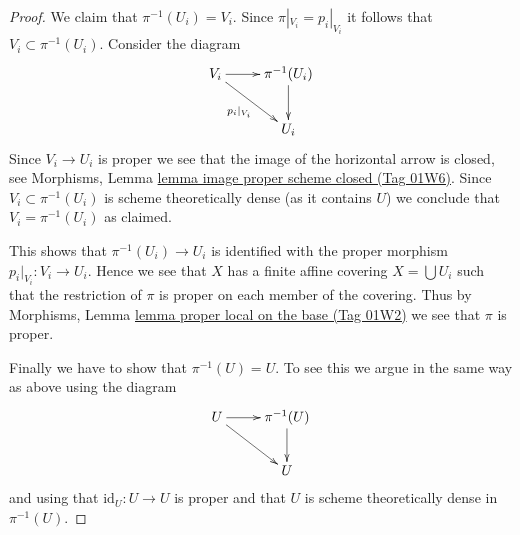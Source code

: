 \documentclass{amsart}
\theoremstyle{plain}
\theoremstyle{definition}
\theoremstyle{remark}
\numberwithin{equation}{subsection}
\begin{document}
\begin{proof}
\medskip\noindent
We claim that $\pi^{-1}(U_i) = V_i$.
Since $\pi|_{V_i} = p_i|_{V_i}$ it follows that
$V_i \subset \pi^{-1}(U_i)$. Consider the diagram
$$
\xymatrix{
V_i \ar[r] \ar[rd]_{p_i|_{V_i}} & \pi^{-1}(U_i) \ar[d] \\
& U_i
}
$$
Since $V_i \to U_i$ is proper we see that the image of
the horizontal arrow is closed, see
Morphisms, Lemma \href{https://stacks.math.columbia.edu/tag/01W6}{lemma image proper scheme closed (Tag 01W6)}.
Since $V_i \subset \pi^{-1}(U_i)$ is scheme
theoretically dense (as it contains $U$)
we conclude that $V_i = \pi^{-1}(U_i)$ as claimed.

\medskip\noindent
This shows that $\pi^{-1}(U_i) \to U_i$ is identified with the proper
morphism $p_i|_{V_i} : V_i \to U_i$. Hence we see that $X$ has a
finite affine covering $X = \bigcup U_i$ such that the restriction
of $\pi$ is proper on each member of the covering.
Thus by Morphisms, Lemma \href{https://stacks.math.columbia.edu/tag/01W2}{lemma proper local on the base (Tag 01W2)}
we see that $\pi$ is proper.

\medskip\noindent
Finally we have to show that $\pi^{-1}(U) = U$. To see this we argue in the
same way as above using the diagram
$$
\xymatrix{
U \ar[r] \ar[rd] & \pi^{-1}(U) \ar[d] \\
& U
}
$$
and using that $\text{id}_U : U \to U$ is proper and that
$U$ is scheme theoretically dense in $\pi^{-1}(U)$.
\end{proof}
\end{document}
